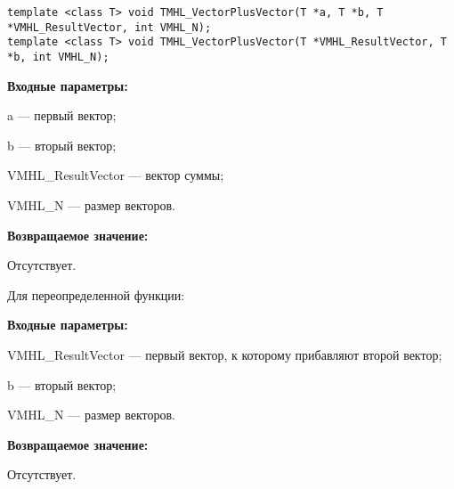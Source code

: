 \documentclass[a4paper,12pt]{article}
\begin{document}
\begin{lstlisting}[label=code_syntax_TMHL_VectorPlusVector,caption=Синтаксис]
template <class T> void TMHL_VectorPlusVector(T *a, T *b, T *VMHL_ResultVector, int VMHL_N);
template <class T> void TMHL_VectorPlusVector(T *VMHL_ResultVector, T *b, int VMHL_N);
\end{lstlisting}

\textbf{Входные параметры:}

  a --- первый вектор;
  
 b --- вторый вектор;
 
 VMHL\_ResultVector --- вектор суммы;
 
 VMHL\_N --- размер векторов.

\textbf{Возвращаемое значение:}

Отсутствует.

Для переопределенной функции:

\textbf{Входные параметры:}

 VMHL\_ResultVector --- первый вектор, к которому прибавляют второй вектор;
  
 b --- вторый вектор;
 
 VMHL\_N --- размер векторов.

\textbf{Возвращаемое значение:}

Отсутствует.
\end{document}
